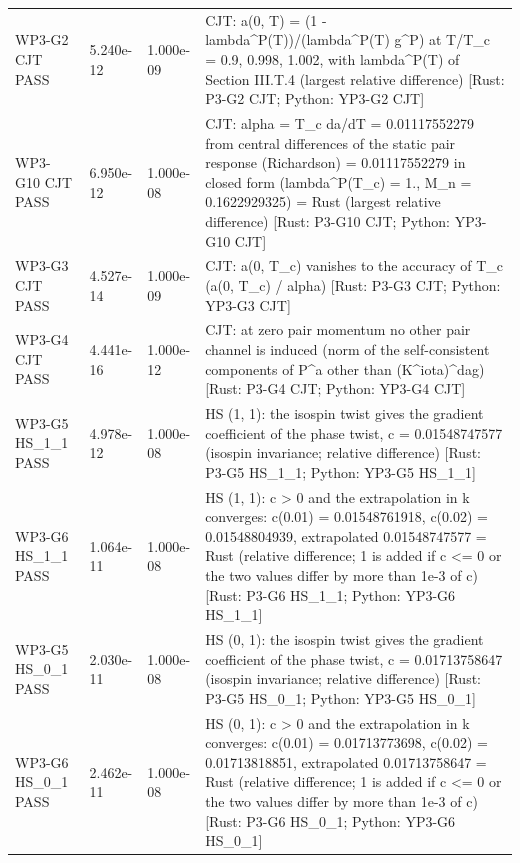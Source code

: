 \documentclass[aps,prd,onecolumn,superscriptaddress,nofootinbib,floatfix,longbibliography]{revtex4-2}
\begin{document}
\begin{longtable}{p{}p{}p{}p{}}
WP3-G2 CJT \newline PASS & 5.240e-12 & 1.000e-09 & CJT: a(0, T) = (1 - lambda\textasciicircum{}P(T))/(lambda\textasciicircum{}P(T) g\textasciicircum{}P) at T/T\_c = 0.9, 0.998, 1.002, with lambda\textasciicircum{}P(T) of Section III.T.4 (largest relative difference) [Rust: P3-G2 CJT; Python: YP3-G2 CJT] \\
WP3-G10 CJT \newline PASS & 6.950e-12 & 1.000e-08 & CJT: alpha = T\_c da/dT = 0.01117552279 from central differences of the static pair response (Richardson) = 0.01117552279 in closed form (lambda\textasciicircum{}P(T\_c) = 1., M\_n = 0.1622929325) = Rust (largest relative difference) [Rust: P3-G10 CJT; Python: YP3-G10 CJT] \\
WP3-G3 CJT \newline PASS & 4.527e-14 & 1.000e-09 & CJT: a(0, T\_c) vanishes to the accuracy of T\_c (\textbar{}a(0, T\_c)\textbar{} / alpha) [Rust: P3-G3 CJT; Python: YP3-G3 CJT] \\
WP3-G4 CJT \newline PASS & 4.441e-16 & 1.000e-12 & CJT: at zero pair momentum no other pair channel is induced (norm of the self-consistent components of P\textasciicircum{}a other than (K\textasciicircum{}iota)\textasciicircum{}dag) [Rust: P3-G4 CJT; Python: YP3-G4 CJT] \\
WP3-G5 HS\_1\_1 \newline PASS & 4.978e-12 & 1.000e-08 & HS (1, 1): the isospin twist gives the gradient coefficient of the phase twist, c = 0.01548747577 (isospin invariance; relative difference) [Rust: P3-G5 HS\_1\_1; Python: YP3-G5 HS\_1\_1] \\
WP3-G6 HS\_1\_1 \newline PASS & 1.064e-11 & 1.000e-08 & HS (1, 1): c \textgreater{} 0 and the extrapolation in k converges: c(0.01) = 0.01548761918, c(0.02) = 0.01548804939, extrapolated 0.01548747577 = Rust (relative difference; 1 is added if c \textless{}= 0 or the two values differ by more than 1e-3 of c) [Rust: P3-G6 HS\_1\_1; Python: YP3-G6 HS\_1\_1] \\
WP3-G5 HS\_0\_1 \newline PASS & 2.030e-11 & 1.000e-08 & HS (0, 1): the isospin twist gives the gradient coefficient of the phase twist, c = 0.01713758647 (isospin invariance; relative difference) [Rust: P3-G5 HS\_0\_1; Python: YP3-G5 HS\_0\_1] \\
WP3-G6 HS\_0\_1 \newline PASS & 2.462e-11 & 1.000e-08 & HS (0, 1): c \textgreater{} 0 and the extrapolation in k converges: c(0.01) = 0.01713773698, c(0.02) = 0.01713818851, extrapolated 0.01713758647 = Rust (relative difference; 1 is added if c \textless{}= 0 or the two values differ by more than 1e-3 of c) [Rust: P3-G6 HS\_0\_1; Python: YP3-G6 HS\_0\_1] \\

\end{longtable}
\end{document}
